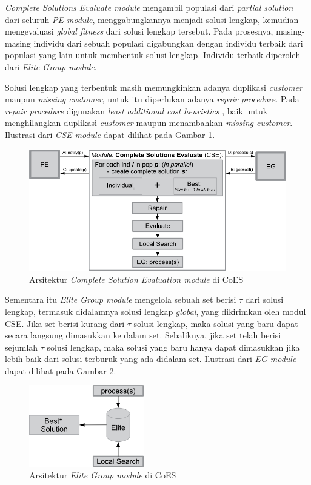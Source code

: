 \textit{Complete Solutions Evaluate module} mengambil populasi dari \textit{partial solution} dari seluruh \textit{PE module}, menggabungkannya menjadi solusi lengkap, kemudian mengevaluasi \textit{global fitness} dari solusi lengkap tersebut. Pada prosesnya, masing-masing individu dari sebuah populasi digabungkan dengan individu terbaik dari populasi yang lain untuk membentuk solusi lengkap. Individu terbaik diperoleh dari \textit{Elite Group module}.


Solusi lengkap yang terbentuk masih memungkinkan adanya duplikasi \textit{customer} maupun \textit{missing customer}, untuk itu diperlukan adanya \textit{repair procedure}. Pada \textit{repair procedure} digunakan \textit{least additional cost heuristics} \citep{raff_routing_1983}, baik untuk menghilangkan duplikasi \textit{customer} maupun menambahkan \textit{missing customer}. Ilustrasi dari \textit{CSE module} dapat dilihat pada Gambar \ref{fig:coes_cse_module}.


\begin{figure}[h]
	\centering
	\includegraphics[width=\textwidth]{../../Resources/Images/coes_cse_module}
	\caption{Arsitektur \textit{Complete Solution Evaluation module} di CoES}
	\label{fig:coes_cse_module}
\end{figure}


Sementara itu \textit{Elite Group module} mengelola sebuah set berisi $\tau$ dari solusi lengkap, termasuk didalamnya solusi lengkap \textit{global}, yang dikirimkan oleh modul CSE. Jika set berisi kurang dari $\tau$ solusi lengkap, maka solusi yang baru dapat secara langsung dimasukkan ke dalam set. Sebaliknya, jika set telah berisi sejumlah $\tau$ solusi lengkap, maka solusi yang baru hanya dapat dimasukkan jika lebih baik dari solusi terburuk yang ada didalam set. Ilustrasi dari \textit{EG module} dapat dilihat pada Gambar \ref{fig:coes_eg_module}.


\begin{figure}[h]
	\centering
	\includegraphics[width=5cm]{../../Resources/Images/coes_eg_module}
	\caption{Arsitektur \textit{Elite Group module} di CoES}
	\label{fig:coes_eg_module}
\end{figure}


